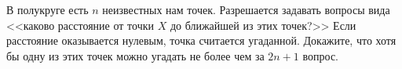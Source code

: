 \documentclass{article}
\begin{document}
В полукруге есть $n$ неизвестных нам точек. Разрешается задавать вопросы вида <<каково расстояние от точки $X$ до ближайшей 
из этих точек?>> Если расстояние оказывается нулевым, точка считается угаданной. Докажите, что хотя бы одну из этих точек можно угадать не более чем за $2n+1$ вопрос.
\end{document}
